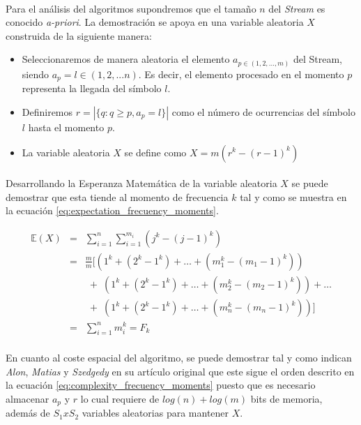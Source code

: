 \documentclass{subfiles}
\begin{document}
      \paragraph{}
      Para el análisis del algoritmos supondremos que el tamaño $n$ del \emph{Stream} es conocido \emph{a-priori}. La demostración se apoya en una variable aleatoria $X$ construida de la siguiente manera:

      \begin{itemize}
        \item Seleccionaremos de manera aleatoria el elemento $a_{p \in (1,2,...,m)}$ del Stream, siendo $a_p = l \in (1,2,...n)$. Es decir, el elemento procesado en el momento $p$ representa la llegada del símbolo $l$.
        \item Definiremos $r=|\{q:q\geq p,a_{p}=l\}|$ como el número de ocurrencias del símbolo $l$ hasta el momento $p$.
        \item La variable aleatoria $X$ se define como $X=m(r^{k}-(r-1)^{k})$
      \end{itemize}

      \paragraph{}
      Desarrollando la Esperanza Matemática de la variable aleatoria $X$ se puede demostrar que esta tiende al momento de frecuencia $k$ tal y como se muestra en la ecuación \eqref{eq:expectation_frecuency_moments}.

      \begin{equation}
      \label{eq:expectation_frecuency_moments}
        {\displaystyle {\begin{array}{lll}\mathbb{E}(X)&=&\sum _{i=1}^{n}\sum _{i=1}^{m_{i}}(j^{k}-(j-1)^{k})\\&=&{\frac {m}{m}}[(1^{k}+(2^{k}-1^{k})+\ldots +(m_{1}^{k}-(m_{1}-1)^{k}))\\&&\;+\;(1^{k}+(2^{k}-1^{k})+\ldots +(m_{2}^{k}-(m_{2}-1)^{k}))+\ldots \\&&\;+\;(1^{k}+(2^{k}-1^{k})+\ldots +(m_{n}^{k}-(m_{n}-1)^{k}))]\\&=&\sum _{i=1}^{n}m_{i}^{k}=F_{k}\end{array}}}
      \end{equation}

      \paragraph{}
      En cuanto al coste espacial del algoritmo, se puede demostrar tal y como indican \emph{Alon}, \emph{Matias} y \emph{Szedgedy} en su artículo original \cite{alon1996space} que este sigue el orden descrito en la ecuación \eqref{eq:complexity_frecuency_moments} puesto que es necesario almacenar $a_p$ y $r$ lo cual requiere de $log(n) + log(m)$ bits de memoria, además de $S_1 x S_2$ variables aleatorias para mantener $X$.
\end{document}
